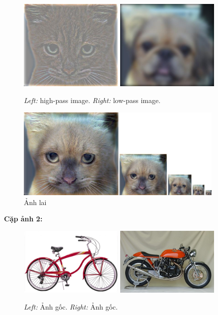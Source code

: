 \begin{figure}[H]
    \centering
    \includegraphics[width=5cm]{images/results_part2/cat_dog/high_frequencies.jpg}
    \includegraphics[width=5cm]{images/results_part2/cat_dog/low_frequencies.jpg}
    \caption{\emph{Left:} high-pass image. \emph{Right:} low-pass image.}
\end{figure}
\begin{figure}[H]
    \centering
    \includegraphics[width=10cm]{images/results_part2/cat_dog/hybrid_image_scales.jpg}
    \caption{Ảnh lai}
\end{figure}

\textbf{Cặp ảnh 2:}
\begin{figure}[H]
    \centering
    \includegraphics[width=5cm]{images/results_part2/motorcycle_bicycle/02_bicycle.jpg}
    \includegraphics[width=5cm]{images/results_part2/motorcycle_bicycle/02_motorcycle.jpg}
    \caption{\emph{Left:} Ảnh gốc. \emph{Right:} Ảnh gốc.}
\end{figure}

